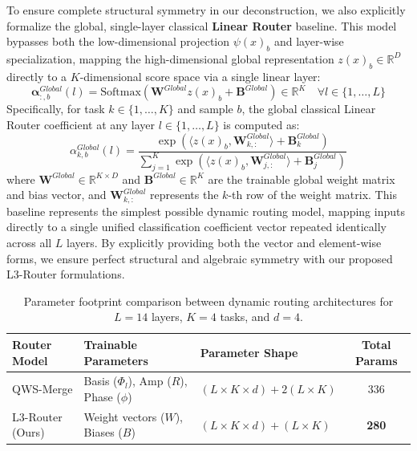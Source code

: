 To ensure complete structural symmetry in our deconstruction, we also explicitly formalize the global, single-layer classical \textbf{Linear Router} baseline. This model bypasses both the low-dimensional projection $\psi(x)_b$ and layer-wise specialization, mapping the high-dimensional global representation $z(x)_b \in \mathbb{R}^D$ directly to a $K$-dimensional score space via a single linear layer:
\begin{equation}
    \boldsymbol{\alpha}_{:, b}^{Global}(l) = \text{Softmax}\left( \mathbf{W}^{Global} z(x)_b + \mathbf{B}^{Global} \right) \in \mathbb{R}^K \quad \forall l \in \{1, \dots, L\}
\end{equation}
Specifically, for task $k \in \{1, \dots, K\}$ and sample $b$, the global classical Linear Router coefficient at any layer $l \in \{1, \dots, L\}$ is computed as:
\begin{equation}
    \alpha_{k, b}^{Global}(l) = \frac{\exp\left( \langle z(x)_b, \mathbf{W}^{Global}_{k, :} \rangle + \mathbf{B}^{Global}_k \right)}{\sum_{j=1}^K \exp\left( \langle z(x)_b, \mathbf{W}^{Global}_{j, :} \rangle + \mathbf{B}^{Global}_j \right)}
\end{equation}
where $\mathbf{W}^{Global} \in \mathbb{R}^{K \times D}$ and $\mathbf{B}^{Global} \in \mathbb{R}^K$ are the trainable global weight matrix and bias vector, and $\mathbf{W}^{Global}_{k, :}$ represents the $k$-th row of the weight matrix. This baseline represents the simplest possible dynamic routing model, mapping inputs directly to a single unified classification coefficient vector repeated identically across all $L$ layers. By explicitly providing both the vector and element-wise forms, we ensure perfect structural and algebraic symmetry with our proposed L3-Router formulations.

\begin{table}[h]
\centering
\caption{Parameter footprint comparison between dynamic routing architectures for $L=14$ layers, $K=4$ tasks, and $d=4$.}
\label{tab:param_count}
\begin{tabular}{lllc}
\toprule
\textbf{Router Model} & \textbf{Trainable Parameters} & \textbf{Parameter Shape} & \textbf{Total Params} \\
\midrule
QWS-Merge & Basis ($\Phi_l$), Amp ($R$), Phase ($\phi$) & $(L \times K \times d) + 2(L \times K)$ & 336 \\
L3-Router (Ours) & Weight vectors ($W$), Biases ($B$) & $(L \times K \times d) + (L \times K)$ & \textbf{280} \\
\bottomrule
\end{tabular}
\end{table}

